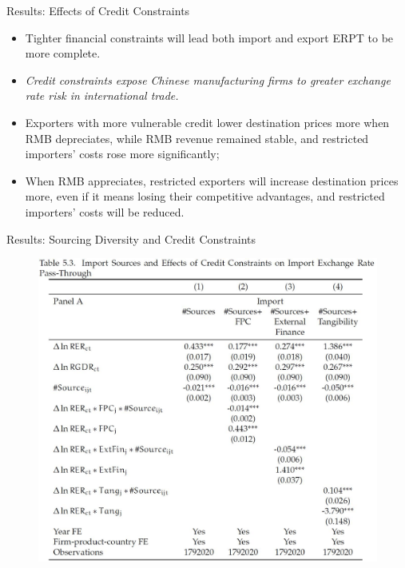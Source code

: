 \documentclass[10pt]{beamer}
\begin{document}
\begin{frame}{Results: Effects of Credit Constraints}
	\begin{tcolorbox}[colback=blue!5!white, colframe=blue!75!black,title=Key Finding 2]
		\begin{itemize}
			\item Tighter financial constraints will lead both import and export ERPT to be more complete.
		\end{itemize}
	\end{tcolorbox}
	\begin{itemize}
		\item \textit{Credit constraints expose Chinese manufacturing firms to greater exchange rate risk in international trade.}
		\item Exporters with more vulnerable credit lower destination prices more when RMB depreciates, while RMB revenue remained stable, and restricted importers' costs rose more significantly; 
		\item When RMB appreciates, restricted exporters will increase destination prices more, even if it means losing their competitive advantages, and restricted importers' costs will be reduced.
	\end{itemize}
\end{frame}

\begin{frame}{Results: Sourcing Diversity and Credit Constraints}
	\begin{figure}[htbp]
		\centering
		\includegraphics[width=0.75\columnwidth]{Table5.3.jpg}
		\label{tab5.3}
	\end{figure}
\end{frame}
\end{document}
